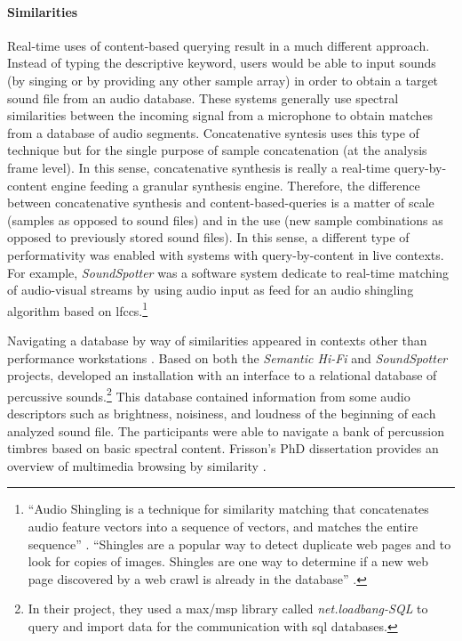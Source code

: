 {	\paragraph{Similarities}
	Real-time uses of content-based querying result in a much different approach. Instead of typing the descriptive keyword, users would be able to input sounds (by singing or by providing any other sample array) in order to obtain a target sound file from an audio database. These systems generally use spectral similarities between the incoming signal from a microphone to obtain matches from a database of audio segments. Concatenative syntesis uses this type of technique but for the single purpose of sample concatenation (at the analysis frame level). In this sense, concatenative synthesis is really a real-time query-by-content engine feeding a granular synthesis engine. Therefore, the difference between concatenative synthesis and content-based-queries is a matter of scale (samples as opposed to sound files) and in the use (new sample combinations as opposed to previously stored sound files). In this sense, a different type of performativity was enabled with systems with query-by-content in live contexts. For example, \textit{SoundSpotter} \parencite{DBLP:conf/icmc/CaseyG07} was a software system dedicate to real-time matching of audio-visual streams by using audio input as feed for an audio shingling algorithm based on \glspl{lfcc}.\footnote{``Audio Shingling is a technique for similarity matching that concatenates audio feature vectors into a sequence of vectors, and matches the entire sequence'' \parencite{DBLP:conf/icmc/CaseyG07}. ``Shingles are a popular way to detect duplicate web pages and to look for copies of images. Shingles are one way to determine if a new web page discovered by a web crawl is already in the database'' \parencite{DBLP:conf/ismir/CaseyS06}.}

	Navigating a database by way of similarities appeared in contexts other than performance workstations \parencite{Price2008}. Based on both the \textit{Semantic Hi-Fi} and \textit{SoundSpotter} projects, \citeauthor{Price2008} developed an installation with an interface to a relational database of percussive sounds.\footnote{In their project, they used a \gls{max/msp} library called \textit{net.loadbang-SQL} to query and import data for the communication with \gls{sql} databases.} This database contained information from some audio descriptors such as brightness, noisiness, and loudness of the beginning of each analyzed sound file. The participants were able to navigate a bank of percussion timbres based on basic spectral content. Frisson's PhD dissertation provides an overview of multimedia browsing by similarity \parencite{Frisson2015}.

}
